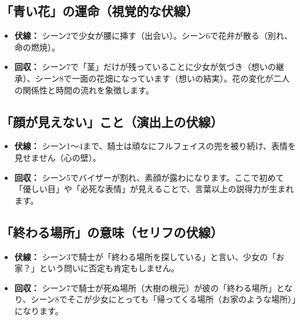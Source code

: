 \subsection{「青い花」の運命（視覚的な伏線）}
\begin{itemize}
    \item \textbf{伏線：} シーン2で少女が腰に挿す（出会い）。シーン6で花弁が散る（別れ、命の燃焼）。
    \item \textbf{回収：} シーン7で「茎」だけが残っていることに少女が気づき（想いの継承）、シーン8で一面の花畑になっています（想いの結実）。花の変化が二人の関係性と時間の流れを象徴します。
\end{itemize}

\subsection{「顔が見えない」こと（演出上の伏線）}
\begin{itemize}
    \item \textbf{伏線：} シーン1〜4まで、騎士は頑なにフルフェイスの兜を被り続け、表情を見せません（心の壁）。
    \item \textbf{回収：} シーン5でバイザーが割れ、素顔が露わになります。ここで初めて「優しい目」や「必死な表情」が見えることで、言葉以上の説得力が生まれます。
\end{itemize}

\subsection{「終わる場所」の意味（セリフの伏線）}
\begin{itemize}
    \item \textbf{伏線：} シーン3で騎士が「終わる場所を探している」と言い、少女の「お家？」という問いに否定も肯定もしません。
    \item \textbf{回収：} シーン7で騎士が死ぬ場所（大樹の根元）が彼の「終わる場所」となり、シーン8でそこが少女にとっても「帰ってくる場所（お家のような場所）」になります。
\end{itemize}

